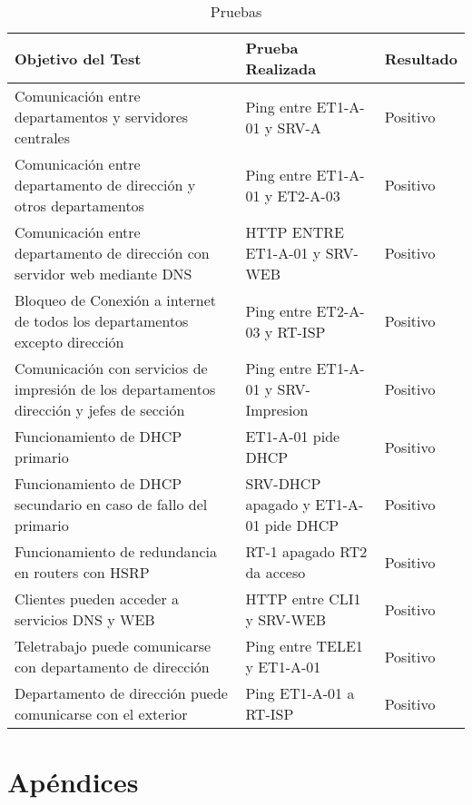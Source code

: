 \documentclass[a4paper,onecolumn,11pt]{article}
\begin{document}
\begin{table}[htbp]
\small \sffamily
\caption{Pruebas}
\begin{center}
\begin{tabular}{p{}p{}p{}}
\toprule
\textbf{Objetivo del Test} &  \textbf{Prueba Realizada} & \textbf{Resultado}\\
\toprule
Comunicación entre departamentos y servidores centrales & Ping entre ET1-A-01 y SRV-A & Positivo  \\ \midrule
Comunicación entre departamento de dirección y otros departamentos& Ping entre ET1-A-01 y ET2-A-03 & Positivo\\ \midrule
Comunicación entre departamento de dirección con servidor web mediante DNS& HTTP ENTRE ET1-A-01 y SRV-WEB & Positivo \\ \midrule
Bloqueo de Conexión a internet de todos los departamentos excepto dirección & Ping entre ET2-A-03 y RT-ISP & Positivo \\ \midrule
Comunicación con servicios de impresión de los departamentos dirección y jefes de sección& Ping entre ET1-A-01 y SRV-Impresion & Positivo\\ \midrule
Funcionamiento de DHCP primario& ET1-A-01 pide DHCP & Positivo\\ \midrule
Funcionamiento de DHCP secundario en caso de fallo del primario& SRV-DHCP apagado y ET1-A-01 pide DHCP  & Positivo \\ \midrule
Funcionamiento de redundancia en routers con HSRP & RT-1 apagado RT2 da acceso & Positivo \\ \midrule
Clientes pueden acceder a servicios DNS y WEB&  HTTP entre CLI1 y SRV-WEB& Positivo \\ \midrule
Teletrabajo puede comunicarse con departamento de dirección & Ping entre TELE1 y ET1-A-01 & Positivo \\ \midrule
Departamento de dirección puede comunicarse con el exterior&Ping ET1-A-01 a RT-ISP  &Positivo \\ 
\bottomrule
\end{tabular}
\end{center}
\label{tab:tests}
\end{table}



\appendix

\section{Apéndices}
\end{document}
